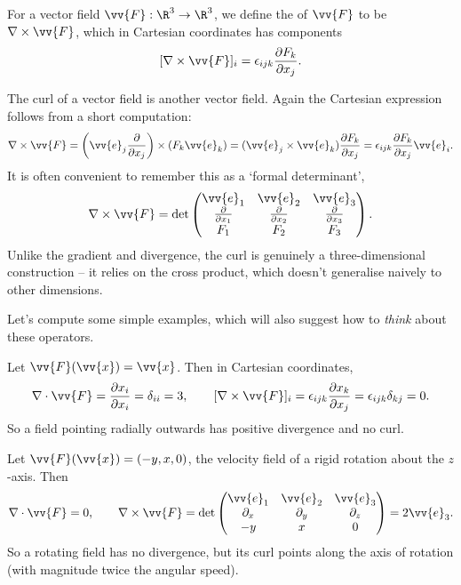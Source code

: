 \begin{definition}[Curl]
	For a vector field $\vv{F} : \R^3 \rightarrow \R^3$, we define the  of $\vv{F}$ to be $\nabla \times \vv{F}$, which in Cartesian coordinates has components
	$$
	[\nabla \times \vv{F}]_i = \epsilon_{ijk} \frac{\partial F_k}{\partial x_j}.
	$$
\end{definition}

The curl of a vector field is another vector field. Again the Cartesian expression follows from a short computation:
$$
\nabla \times \vv{F} = \left(\vv{e}_j \frac{\partial}{\partial x_j}\right) \times (F_k \vv{e}_k) = (\vv{e}_j \times \vv{e}_k) \frac{\partial F_k}{\partial x_j} = \epsilon_{ijk} \frac{\partial F_k}{\partial x_j} \vv{e}_i.
$$
It is often convenient to remember this as a `formal determinant',
$$
\nabla \times \vv{F} = \det \begin{pmatrix}
	\vv{e}_1 & \vv{e}_2 & \vv{e}_3 \\
	\frac{\partial}{\partial x_1} & \frac{\partial}{\partial x_2} & \frac{\partial}{\partial x_3} \\
	F_1 & F_2 & F_3
\end{pmatrix}.
$$
Unlike the gradient and divergence, the curl is genuinely a three-dimensional construction -- it relies on the cross product, which doesn't generalise naively to other dimensions.

Let's compute some simple examples, which will also suggest how to \emph{think} about these operators.

\begin{example}
	Let $\vv{F}(\vv{x}) = \vv{x}$. Then in Cartesian coordinates,
	$$
	\nabla \cdot \vv{F} = \frac{\partial x_i}{\partial x_i} = \delta_{ii} = 3,
	\quad \quad
	[\nabla \times \vv{F}]_i = \epsilon_{ijk} \frac{\partial x_k}{\partial x_j} = \epsilon_{ijk} \delta_{kj} = 0.
	$$
	So a field pointing radially outwards has positive divergence and no curl.
\end{example}

\begin{example}
	Let $\vv{F}(\vv{x}) = (-y, x, 0)$, the velocity field of a rigid rotation about the $z$-axis. Then
	$$
	\nabla \cdot \vv{F} = 0, \quad \quad \nabla \times \vv{F} = \det\begin{pmatrix}
		\vv{e}_1 & \vv{e}_2 & \vv{e}_3 \\
		\partial_x & \partial_y & \partial_z \\
		-y & x & 0
	\end{pmatrix} = 2 \vv{e}_3.
	$$
	So a rotating field has no divergence, but its curl points along the axis of rotation (with magnitude twice the angular speed).
\end{example}

